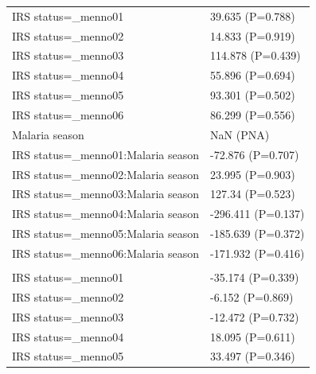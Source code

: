 \documentclass[]{article}
\begin{document}
\begin{longtable}[t]{ll}
\hspace{1em}IRS status=\_menno01 & 39.635 (P=0.788)\\
\hspace{1em}IRS status=\_menno02 & 14.833 (P=0.919)\\
\hspace{1em}IRS status=\_menno03 & 114.878 (P=0.439)\\
\hspace{1em}IRS status=\_menno04 & 55.896 (P=0.694)\\
\hspace{1em}IRS status=\_menno05 & 93.301 (P=0.502)\\
\hspace{1em}IRS status=\_menno06 & 86.299 (P=0.556)\\
\hspace{1em}Malaria season & NaN (PNA)\\
\hspace{1em}IRS status=\_menno01:Malaria season & -72.876 (P=0.707)\\
\hspace{1em}IRS status=\_menno02:Malaria season & 23.995 (P=0.903)\\
\hspace{1em}IRS status=\_menno03:Malaria season & 127.34 (P=0.523)\\
\hspace{1em}IRS status=\_menno04:Malaria season & -296.411 (P=0.137)\\
\hspace{1em}IRS status=\_menno05:Malaria season & -185.639 (P=0.372)\\
\hspace{1em}IRS status=\_menno06:Malaria season & -171.932 (P=0.416)\\
\addlinespace[1.5em]
\multicolumn{2}{l}{\textbf{Temporary field worker}}\\
\hspace{1em}IRS status=\_menno01 & -35.174 (P=0.339)\\
\hspace{1em}IRS status=\_menno02 & -6.152 (P=0.869)\\
\hspace{1em}IRS status=\_menno03 & -12.472 (P=0.732)\\
\hspace{1em}IRS status=\_menno04 & 18.095 (P=0.611)\\
\hspace{1em}IRS status=\_menno05 & 33.497 (P=0.346)\\

\end{longtable}
\end{document}
